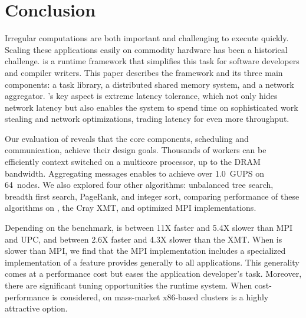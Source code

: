 \section{Conclusion}

Irregular computations are both important and challenging to execute
quickly.  Scaling these applications easily on commodity hardware has
been a historical challenge. \Grappa is a runtime framework that
simplifies this task for software developers and compiler
writers. This paper describes the \Grappa framework and its three main
components: a task library, a distributed shared memory system, and a
network aggregator. \Grappa's key aspect is extreme latency tolerance,
which not only hides network latency but also enables the system to
spend time on sophisticated work stealing and network optimizations,
trading latency for even more throughput.

Our evaluation of \Grappa reveals that the core components, scheduling
and communication, achieve their design goals.  Thousands of workers
can be efficiently context switched on a multicore processor, up to
the DRAM bandwidth.  Aggregating messages enables \Grappa to achieve
over 1.0~GUPS on 64~nodes.  We also explored four other algorithms:
unbalanced tree search, breadth first search, PageRank, and integer
sort, comparing performance of these algorithms on \Grappa, the Cray
XMT, and optimized MPI implementations.

Depending on the benchmark, \Grappa is between 11X faster and 5.4X
slower than MPI and UPC, and between 2.6X faster and 4.3X slower than
the XMT. When \Grappa is slower than MPI, we find that the MPI
implementation includes a specialized implementation of a feature
\Grappa provides generally to all applications. This generality comes
at a performance cost but eases the application developer's
task. Moreover, there are significant tuning opportunities the \Grappa
runtime system.  When cost-performance is considered, \Grappa on mass-market
x86-based clusters is a highly attractive option.
